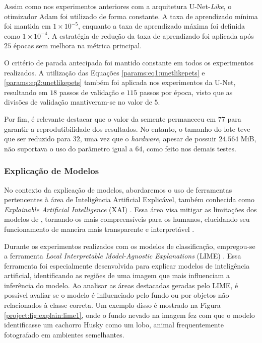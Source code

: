 Assim como nos experimentos anteriores com a arquitetura U-Net-\textit{Like}, o otimizador Adam foi utilizado de forma constante. A taxa de aprendizado mínima foi mantida em $1 \times 10^{-5}$, enquanto a taxa de aprendizado máxima foi definida como $1 \times 10^{-4}$. A estratégia de redução da taxa de aprendizado foi aplicada após $25$ épocas sem melhora na métrica principal.

O critério de parada antecipada foi mantido constante em todos os experimentos realizados. A utilização das Equações \ref{params:eq1:unetlikepets} e \ref{params:eq2:unetlikepets} também foi aplicada nos experimentos da U-Net, resultando em $18$ passos de validação e $115$ passos por época, visto que as divisões de validação mantiveram-se no valor de $5$.

Por fim, é relevante destacar que o valor da semente permaneceu em $77$ para garantir a reprodutibilidade dos resultados. No entanto, o tamanho do lote teve que ser reduzido para $32$, uma vez que o \textit{hardware}, apesar de possuir $24.564$ MiB, não suportava o uso do parâmetro igual a $64$, como feito nos demais testes.


\subsubsection{Explicação de Modelos}
\label{project:explain}
No contexto da explicação de modelos, abordaremos o uso de ferramentas pertencentes à área de Inteligência Artificial Explicável, também conhecida como \textit{Explainable Artificial Intelligence} (XAI) \citep{Gunning2019XAIExplainableIntelligence}. Essa área visa mitigar as limitações dos modelos de , tornando-os mais compreensíveis para os humanos, elucidando seu funcionamento de maneira mais transparente e interpretável \citep{Angelov2021ExplainableReview}.

Durante os experimentos realizados com os modelos de classificação, empregou-se a ferramenta \textit{Local Interpretable Model-Agnostic Explanations} (LIME) \citep{Ribeiro2016WhyClassifier}. Essa ferramenta foi especialmente desenvolvida para explicar modelos de inteligência artificial, identificando as regiões de uma imagem que mais influenciam a inferência do modelo. Ao analisar as áreas destacadas geradas pelo LIME, é possível avaliar se o modelo é influenciado pelo fundo ou por objetos não relacionados à classe correta. Um exemplo disso é mostrado na Figura \ref{project:fig:explain:lime1}, onde o fundo nevado na imagem fez com que o modelo identificasse um cachorro Husky como um lobo, animal frequentemente fotografado em ambientes semelhantes.

